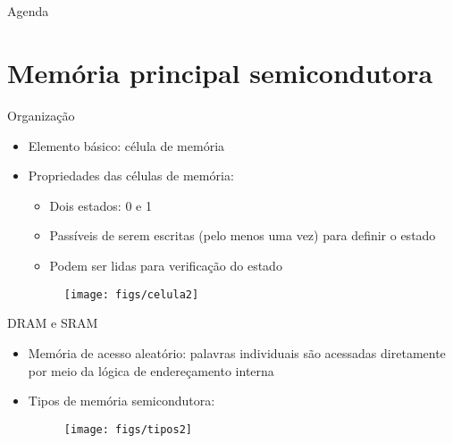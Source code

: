 



\title{\cursogrande\\ \vspace{1cm}{Memória interna}}


\maketitle[randomdots={false}]

\begin{slide}{Agenda}
      \tableofcontents[content=sections]
   \end{slide}

\section[slide=true]{Memória principal semicondutora}
\begin{slide}{Organização}
   \begin{itemize}
      \item Elemento básico: célula de memória
      \item Propriedades das células de memória:
      \begin{itemize}
         \item Dois estados: 0 e 1
         \item Passíveis de serem escritas (pelo menos uma vez) para definir o estado
         \item Podem ser lidas para verificação do estado
      \end{itemize}
      \begin{figure}[h]
         \centering
         \texttt{[image: figs/celula2]}
      \end{figure}
   \end{itemize}
\end{slide}

\begin{slide}{DRAM e SRAM}
   \begin{itemize}
      \item Memória de acesso aleatório: palavras individuais são acessadas diretamente por meio da lógica de endereçamento interna
      \item Tipos de memória semicondutora:
      \begin{figure}[h]
         \centering
         \texttt{[image: figs/tipos2]}
      \end{figure}
   \end{itemize}
\end{slide}

